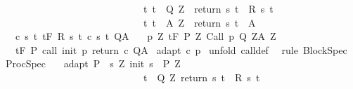 \begin{isabellebody}
\ \ \ \ \ \ \ \ \ \ \ \ \ \ \ \ \ \ \ \ \ \ \ \ \ \ \ \ \ {\isacharparenleft}{\isasymforall}t{\isachardot}\ t\ {\isasymin}\ Q{\isacharprime}\ Z\ {\isasymlongrightarrow}\ return\ s\ t\ {\isasymin}\ R\ s\ t{\isacharparenright}\ {\isasymand}\isanewline
\ \ \ \ \ \ \ \ \ \ \ \ \ \ \ \ \ \ \ \ \ \ \ \ \ \ \ \ \ {\isacharparenleft}{\isasymforall}t{\isachardot}\ t\ {\isasymin}\ A{\isacharprime}\ Z\ {\isasymlongrightarrow}\ return\ s\ t\ {\isasymin}\ A{\isacharparenright}{\isacharbraceright}{\isachardoublequoteclose}\isanewline
\ \ \ c{\isacharcolon}\ {\isachardoublequoteopen}{\isasymforall}s\ t{\isachardot}\ {\isasymGamma}{\isacharcomma}{\isasymTheta}{\isasymturnstile}\isactrlsub t\isactrlbsub {\isacharslash}F\isactrlesub \ {\isacharparenleft}R\ s\ t{\isacharparenright}\ {\isacharparenleft}c\ s\ t{\isacharparenright}\ Q{\isacharcomma}A{\isachardoublequoteclose}\isanewline
\ \ \ p{\isacharcolon}\ {\isachardoublequoteopen}{\isasymforall}Z{\isachardot}\ {\isasymGamma}{\isacharcomma}{\isasymTheta}{\isasymturnstile}\isactrlsub t\isactrlbsub {\isacharslash}F\isactrlesub \ {\isacharparenleft}P{\isacharprime}\ Z{\isacharparenright}\ Call\ p\ {\isacharparenleft}Q{\isacharprime}\ Z{\isacharparenright}{\isacharcomma}{\isacharparenleft}A{\isacharprime}\ Z{\isacharparenright}{\isachardoublequoteclose}\ \isanewline
\ \ \ {\isachardoublequoteopen}{\isasymGamma}{\isacharcomma}{\isasymTheta}{\isasymturnstile}\isactrlsub t\isactrlbsub {\isacharslash}F\isactrlesub \ P\ {\isacharparenleft}call\ init\ p\ return\ c{\isacharparenright}\ Q{\isacharcomma}A{\isachardoublequoteclose}\isanewline
%
\isadelimproof
%
\endisadelimproof
%
\isatagproof
{}\isamarkupfalse%
\ adapt\ c\ p\isanewline
{}\isamarkupfalse%
\ {\isacharparenleft}unfold\ call{\isacharunderscore}def{\isacharparenright}\ \isanewline
{}\isamarkupfalse%
\ {\isacharparenleft}rule\ BlockSpec{\isacharparenright}%
\endisatagproof
{\isafoldproof}%
%
\isadelimproof
\isanewline
%
\endisadelimproof
\isanewline
{}\isamarkupfalse%
\ ProcSpec{\isacharprime}{\isacharcolon}\isanewline
\ \ \ adapt{\isacharcolon}\ {\isachardoublequoteopen}P\ {\isasymsubseteq}\ {\isacharbraceleft}s{\isachardot}\ {\isasymexists}Z{\isachardot}\ init\ s\ {\isasymin}\ P{\isacharprime}\ Z\ {\isasymand}\ \isanewline
\ \ \ \ \ \ \ \ \ \ \ \ \ \ \ \ \ \ \ \ \ \ \ \ \ \ \ \ \ {\isacharparenleft}{\isasymforall}t\ {\isasymin}\ Q{\isacharprime}\ Z{\isachardot}\ return\ s\ t\ {\isasymin}\ R\ s\ t{\isacharparenright}\ {\isasymand}\isanewline

\end{isabellebody}
